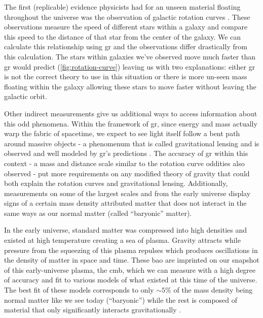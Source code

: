 The first (replicable) evidence physicists had for an unseen material floating throughout the universe was the
observation of galactic rotation curves \cite{rubin-rotationcurve-1980,rotationcurve-2000}. These
observations measure the speed of different stars within a galaxy and compare this speed to the
distance of that star from the center of the galaxy. We can calculate this relationship using
\ac{gr} \cite{rotationcurve-predictions-2007} and the observations differ drastically from this
calculation. The stars within galaxies we've observed move much faster than \ac{gr} would predict
(\cref{fig:rotation-curve}) leaving us with two explanations: either \ac{gr} is not the correct
theory to use in this situation or there is more un-seen mass floating within the galaxy allowing
these stars to move faster without leaving the galactic orbit.

Other indirect measurements give us additional ways to access information about this odd phenomena.
Within the framework of \ac{gr}, since energy and mass actually warp the fabric of spacetime, we
expect to see light itself follow a bent path around massive objects - a phenomenum that is called
gravitational lensing and is observed and well modeled by \ac{gr}'s predictions \cite{gravlensing-2004}.
The accuracy of \ac{gr} within this context - a mass and distance scale similar to the rotation
curve oddities also observed - put more requirements on any modified theory of gravity that could
both explain the rotation curves and gravitational lensing. Additionally, measurements on some of
the largest scales and from the early universe display signs of a certain mass density attributed
matter that does not interact in the same ways as our normal matter (called ``baryonic'' matter).

In the early universe, standard matter was compressed into high densities and existed at high
temperature creating a sea of plasma. Gravity attracts while pressure from the squeezing of this
plasma repulses which produces oscillations in the density of matter in space and time.
These \ac{bao} are imprinted on our snapshot of this early-universe plasma, the
\ac{cmb}, which we can measure with a high degree
of accuracy and fit to various models of what existed at this time of the universe. The best fit of
these models corresponds to only $\sim 5\%$ of the mass density being normal matter like we see
today (``baryonic'') while the rest is composed of material that only significantly interacts
gravitationally \cite{planck-cmb-2015}.

